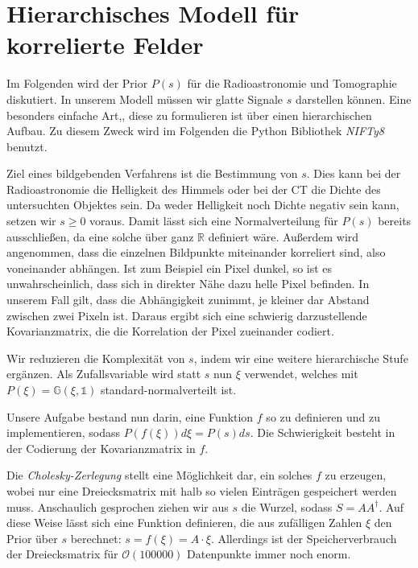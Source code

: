 \section{Hierarchisches Modell für korrelierte Felder}\label{k4.2.hiera}
Im Folgenden wird der Prior $P(s)$ für die Radioastronomie und Tomographie diskutiert. In unserem Modell müssen wir glatte Signale $s$ darstellen können. Eine besonders einfache Art,, diese zu formulieren ist über einen hierarchischen Aufbau. Zu diesem Zweck wird im Folgenden die Python Bibliothek \emph{NIFTy8} benutzt.

Ziel eines bildgebenden Verfahrens ist die Bestimmung von $s$. Dies kann bei der Radioastronomie die Helligkeit des Himmels oder bei der CT die Dichte des untersuchten Objektes sein. Da weder Helligkeit noch Dichte negativ sein kann, setzen wir $s \geq 0$ voraus. Damit lässt sich eine Normalverteilung für $P(s)$ bereits ausschließen, da eine solche über ganz $\mathbb{R}$ definiert wäre. Außerdem wird angenommen, dass die einzelnen Bildpunkte miteinander korreliert sind, also voneinander abhängen. Ist zum Beispiel ein Pixel dunkel, so ist es unwahrscheinlich, dass sich in direkter Nähe dazu helle Pixel befinden. In unserem Fall gilt, dass die Abhängigkeit zunimmt, je kleiner dar Abstand zwischen zwei Pixeln ist. Daraus ergibt sich eine schwierig darzustellende Kovarianzmatrix, die die Korrelation der Pixel zueinander codiert.

Wir reduzieren die Komplexität von $s$, indem wir eine weitere hierarchische Stufe ergänzen. Als Zufallsvariable wird statt $s$ nun $\xi$ verwendet, welches mit $P(\xi) = \mathbb{G}(\xi, \mathds{1})$ standard-nor\-mal\-ver\-teilt ist.

Unsere Aufgabe bestand nun darin, eine Funktion $f$ so zu definieren und zu implementieren, sodass $P(f(\xi)) d \xi = P(s) ds$. Die Schwierigkeit besteht in der Codierung der Kovarianzmatrix in $f$.

Die \emph{Cholesky-Zerlegung} stellt eine Möglichkeit dar, ein solches $f$ zu erzeugen, wobei nur eine Dreiecksmatrix mit halb so vielen Einträgen gespeichert werden muss. Anschaulich gesprochen ziehen wir aus $s$ die Wurzel, sodass $S=A A^{\dagger}$. Auf diese Weise lässt sich eine Funktion definieren, die aus zufälligen Zahlen $\xi$ den Prior über $s$ berechnet: $s = f(\xi) = A \cdot \xi$. Allerdings ist der Speicherverbrauch der Dreiecksmatrix für $\mathcal{O}(100 000)$ Datenpunkte immer noch enorm.

